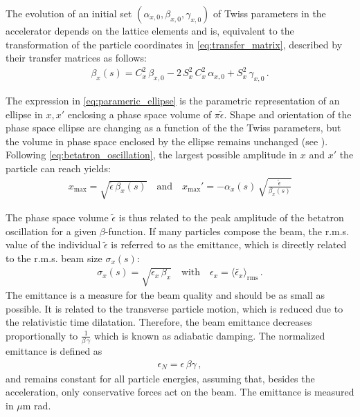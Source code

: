 The evolution of an initial set $(\alpha_{x,0},\beta_{x,0},\gamma_{x,0})$ of Twiss parameters in the accelerator depends on the lattice elements and is, equivalent to the transformation of the particle coordinates in \eqref{eq:transfer_matrix}, described by their transfer matrices as follows:
\begin{align}
  \beta_x(s) = C_x^2 \, \beta_{x,0} -2 \, S_x^2 \, C_x^2 \, \alpha_{x,0} + S_x^2 \, \gamma_{x,0} \, .
\end{align}


The expression in \eqref{eq:parameric_ellipse} is the parametric representation of an ellipse in $x,x'$ enclosing a phase space volume of $\pi \tilde{\epsilon}$. Shape and orientation of the phase space ellipse are changing as a function of the the Twiss parameters, but the volume in phase space enclosed by the ellipse remains unchanged (see ). Following \eqref{eq:betatron_oscillation}, the largest possible amplitude in $x$ and $x'$ the particle can reach yields:
%
\begin{align}
  x_\text{max} = \sqrt{\tilde{\epsilon} \, \beta_x(s)} \quad \text{and} \quad x_\text{max}' = - \alpha_x (s) \, \sqrt{\frac{\tilde{\epsilon}}{\beta_x(s)}}
\end{align}

The phase space volume $\tilde{\epsilon}$ is thus related to the peak amplitude of the betatron oscillation for a given $\beta$-function. If many particles compose the beam, the r.m.s. value of the individual $\tilde{\epsilon}$ is referred to as the emittance, which is directly related to the r.m.s. beam size $\sigma_x(s)$:
%
\begin{align}
  \sigma_x (s) = \sqrt{\epsilon_x \, \beta_x} \quad \text{with} \quad \epsilon_x = \langle \tilde{\epsilon_x} \rangle_{\text{rms}} \, .
\end{align}
%
The emittance is a measure for the beam quality and should be as small as possible. It is related to the transverse particle motion, which is reduced due to the relativistic time dilatation. Therefore, the beam emittance decreases proportionally to $\frac{1}{\beta \, \gamma}$ which is known as adiabatic damping. The normalized emittance is defined as 
%
\begin{align}
  \epsilon_N = \epsilon \, \beta \gamma \, ,
\end{align}
and remains constant for all particle energies, assuming that, besides the acceleration, only conservative forces  act on the beam. The emittance is measured in $\mu$m rad.



